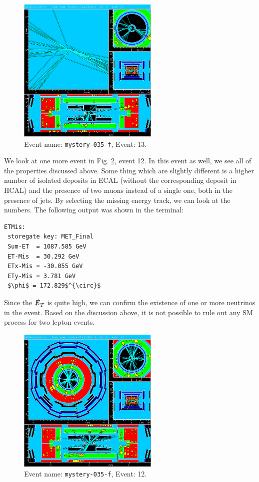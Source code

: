 \documentclass[a4paper]{report}
\numberwithin{equation}{section}
\begin{document}
\begin{figure}[htpb]
    \centering
    \includegraphics[width=0.6\textwidth]{mystery-035_0_00013_f-YX-RZ-RZ-YX-2022-05-23-13-34-34}
    \caption{Event name: \texttt{mystery-035-f}, Event: 13.}
    \label{fig:mys1_2}
\end{figure}


We look at one more event in Fig. \ref{fig:mys3}, event 12. In this event as well, we see all of the properties discussed above. Some thing which are slightly different is a higher number of isolated deposits in ECAL (without the corresponding deposit in HCAL) and the presence of two muons instead of a single one, both in the presence of jets. By selecting the missing energy track, we can look at the numbers. The following output was shown in the terminal: 

\begin{lstlisting}
ETMis:
 storegate key: MET_Final
 Sum-ET  = 1087.585 GeV
 ET-Mis  = 30.292 GeV
 ETx-Mis = -30.055 GeV
 ETy-Mis = 3.781 GeV
 $\phi$ = 172.829$^{\circ}$
 \end{lstlisting}

Since the $\slashed{E}_T$ is quite high, we can confirm the existence of one or more neutrinos in the event. Based on the discussion above, it is not possible to rule out any SM process for two lepton events. 


\begin{figure}[htpb]
    \centering
    \includegraphics[width=0.6\textwidth]{mystery-035_0_00051_f-YX-RZ-RZ-YX-2022-06-18-17-20-41}
    \caption{Event name: \texttt{mystery-035-f}, Event: 12.}
    \label{fig:mys3}
\end{figure}
\end{document}
